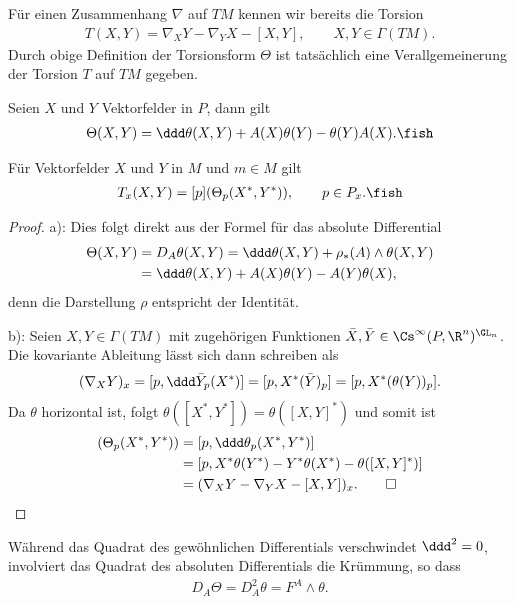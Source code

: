 \documentclass[%
	paper=a5,%
	fleqn,%
	DIV=18,%
	BCOR=0mm,
	fontsize=11pt,
	titlepage=false,%
	bibliography=totoc,
	DIV=18,%
	twoside=true,
	pdftitle=Riemannsche Geometrie,
	pdfauthor=Uwe Semmelmann,
	numbers=noendperiod]%
	{scrbook}
\begin{document}
Für einen Zusammenhang $\nabla$ auf $TM$ kennen wir bereits die Torsion
\begin{align*}
T(X,Y) = \nabla_X Y - \nabla_Y X - [X,Y],\qquad X,Y\in \Gamma(TM).
\end{align*}
Durch obige Definition der Torsionsform $\Theta$ ist tatsächlich eine
Verallgemeinerung der Torsion $T$ auf $TM$ gegeben.

\begin{lem}
\begin{propenum}
\item Seien $X$ und $Y$ Vektorfelder in $P$, dann gilt
\begin{align*}
\Theta(X,Y) = \ddd\theta(X,Y) + A(X)\theta(Y) - \theta(Y)A(X).\fish
\end{align*}
\item Für Vektorfelder $X$ und $Y$ in $M$ und $m\in M$ gilt
\begin{align*}
T_x(X,Y) = [p](\Theta_p(X^*,Y^*)),\qquad p\in P_x.\fish
\end{align*}
\end{propenum}
\end{lem}
\begin{proof}
a): Dies folgt direkt aus der Formel für das absolute Differential
\begin{align*}
\Theta(X,Y) &= D_A \theta(X,Y) = 
\ddd \theta(X,Y) + \rho_*(A)\wedge \theta(X,Y)\\
&= \ddd \theta(X,Y) + A(X)\theta(Y) - A(Y)\theta(X), 
\end{align*}
denn die Darstellung $\rho$ entspricht der Identität.

b): Seien $X,Y\in\Gamma(TM)$ mit zugehörigen Funktionen $\bar{X},\bar{Y}\in
\Cs^\infty(P,\R^n)^{\GL_n}$. Die kovariante Ableitung lässt sich dann schreiben
als
\begin{align*}
(\nabla_X Y)_x = [p,\ddd \bar{Y}_p(X^*)] = [p,X^*(\bar{Y})_p]
= [p,X^*(\theta(Y))_p].
\end{align*}
Da $\theta$ horizontal ist, folgt $\theta([X^*,Y^*]) = \theta([X,Y]^*)$ und
somit ist
\begin{align*}
[p](\Theta_p(X^*,Y^*)) &= [p,\ddd\theta_p(X^*,Y^*)]\\
&= [p,X^*\theta(Y^*)-Y^*\theta(X^*)-\theta([X,Y]^*)]\\
&= (\nabla_X Y - \nabla_Y X - [X,Y])_x.\qed
\end{align*}
\end{proof}

Während das Quadrat des gewöhnlichen Differentials verschwindet $\ddd^2 = 0$,
involviert das Quadrat des absoluten Differentials die Krümmung, so dass
\begin{align*}
D_A \Theta = D_A^2 \theta = F^A\wedge \theta.
\end{align*}
\end{document}
